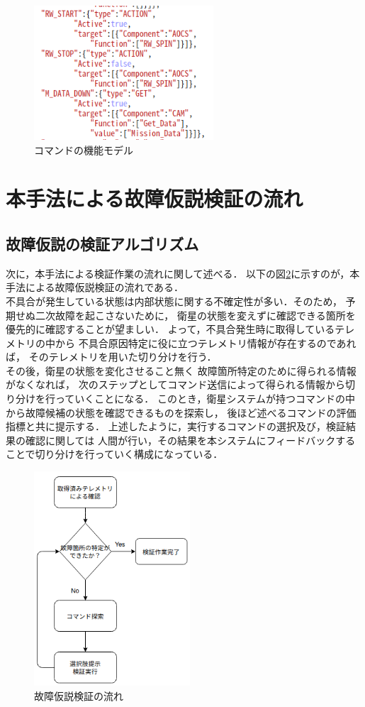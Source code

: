\documentclass[11pt]{jsreport}
\begin{document}
\begin{figure}[H]
   \centering
      \includegraphics[height=5.0cm]{figure/COM_type.png}
      \caption{コマンドの機能モデル}
      \label{fig:COM_type}
\end{figure}

\newpage
\section{本手法による故障仮説検証の流れ}
\subsection{故障仮説の検証アルゴリズム}
次に，本手法による検証作業の流れに関して述べる．
以下の図\ref{fig:whole_fault_flow}に示すのが，本手法による故障仮説検証の流れである．\\
不具合が発生している状態は内部状態に関する不確定性が多い．そのため，
予期せぬ二次故障を起こさないために，
衛星の状態を変えずに確認できる箇所を優先的に確認することが望ましい．
よって，不具合発生時に取得しているテレメトリの中から
不具合原因特定に役に立つテレメトリ情報が存在するのであれば，
そのテレメトリを用いた切り分けを行う．\\
その後，衛星の状態を変化させること無く
故障箇所特定のために得られる情報がなくなれば，
次のステップとしてコマンド送信によって得られる情報から切り分けを行っていくことになる．
このとき，衛星システムが持つコマンドの中から故障候補の状態を確認できるものを探索し，
後ほど述べるコマンドの評価指標と共に提示する．
上述したように，実行するコマンドの選択及び，検証結果の確認に関しては
人間が行い，その結果を本システムにフィードバックすることで切り分けを行っていく構成になっている．

\begin{figure}[H]
   \centering
      \includegraphics[height=8.0cm]{figure/whole_fault_diagnosis_flow.png}
      \caption{故障仮説検証の流れ}
      \label{fig:whole_fault_flow}
\end{figure}
\end{document}
